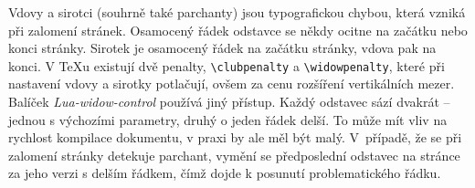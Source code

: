 \documentclass{csbulletin}
\newcommand\balicek[1]{\textit{#1}}
\begin{document}
Vdovy a sirotci (souhrně také parchanty) jsou typografickou chybou, která vzniká
při zalomení stránek. Osamocený řádek odstavce se někdy ocitne na začátku nebo
konci stránky. Sirotek je osamocený řádek na začátku stránky, vdova pak na
konci. V \TeX u existují dvě penalty, \verb|\clubpenalty| a \verb|\widowpenalty|,
které při nastavení vdovy a sirotky potlačují, ovšem za cenu rozšíření
vertikálních mezer. Balíček
\balicek{Lua-widow-control} \cite{lua-widow-control}
používá jiný přístup. Každý odstavec sází dvakrát -- jednou s výchozími
parametry, druhý o jeden řádek delší. To může mít vliv na rychlost kompilace
dokumentu, v praxi by ale měl být malý. V~případě, že se při zalomení stránky
detekuje parchant, vymění se předposlední odstavec na stránce za jeho verzi s delším řádkem, čímž
dojde k posunutí problematického řádku.


% 
%   
% 
% 


\end{document}
